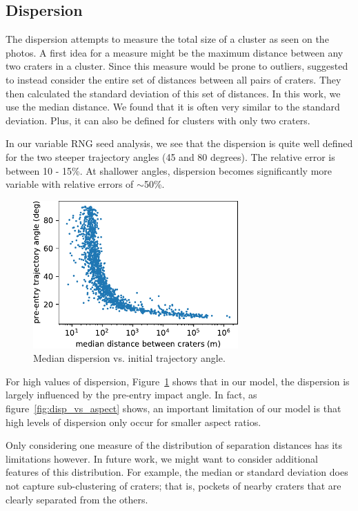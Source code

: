 \subsection{Dispersion}
The dispersion attempts to measure the total size of a cluster as seen on the photos.
A first idea for a measure might be the maximum distance between any two craters in a cluster.
Since this measure would be prone to outliers, \cite{daubar2019recently} suggested to instead consider the entire set of distances between all pairs of craters.
They then calculated the standard deviation of this set of distances.
In this work, we use the median distance. We found that it is often very similar to the standard deviation. Plus, it can also be defined for clusters with only two craters.

In our variable RNG seed analysis, we see that the dispersion is quite well defined for the two steeper trajectory angles (45 and 80 degrees). The relative error is between 10 - 15\%. At shallower angles, dispersion becomes significantly more variable with relative errors of $\sim$50\%. 

\begin{figure}
    \centering
    \includegraphics[width=0.7\textwidth]{figures/disp_vs_angle}
    \caption{Median dispersion vs. initial trajectory angle.}
    \label{fig:disp_vs_angle}
\end{figure}

For high values of dispersion, Figure~\ref{fig:disp_vs_angle} shows that in our model, the dispersion is largely influenced by the pre-entry impact angle. In fact, as figure~\ref{fig:disp_vs_aspect} shows, an important limitation of our model is that high levels of dispersion only occur for smaller aspect ratios.

Only considering one measure of the distribution of separation distances has its limitations however. In future work, we might want to consider additional features of this distribution. For example, the median or standard deviation does not capture sub-clustering of craters; that is, pockets of nearby craters that are clearly separated from the others.

